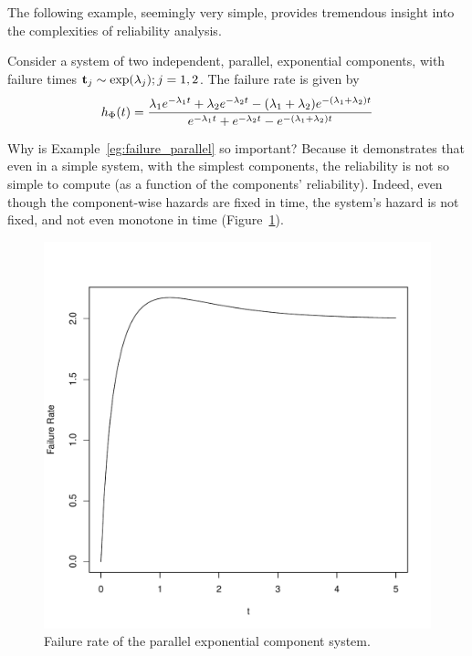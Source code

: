 The following example, seemingly very simple, provides tremendous insight into the complexities of reliability analysis.
\begin{example}
\label{eg:failure_parallel}
Consider a system of two independent, parallel, exponential components, with failure times $\mathbf{t}_j\sim \exp(\lambda_j); j=1,2$.
The failure rate is given by
\begin{align}
	h_{\Phi} (t)=
	\frac
	{\lambda_1 e^{-\lambda_1 t} + \lambda_2 e^{-\lambda_2 t}  - (\lambda_1+ \lambda_2) e^{-(\lambda_1+ \lambda_2) t}}
	{e^{-\lambda_1 t} + e^{-\lambda_2 t} - e^{-(\lambda_1+ \lambda_2) t}}
\end{align}
\end{example}
Why is Example~\ref{eg:failure_parallel} so important?
Because it demonstrates that even in a simple system, with the simplest components, the reliability is not so simple to compute (as a function of the components' reliability). 
Indeed, even though the component-wise hazards are fixed in time, the system's hazard is not fixed, and not even monotone in time (Figure~\ref{fig:hazard_non_monotone}). 


\begin{figure}[ht]
\centering
\includegraphics[width=0.5\linewidth]{art/hazard}
\caption{Failure rate of the parallel exponential component system.}
\label{fig:hazard_non_monotone}
\end{figure}





